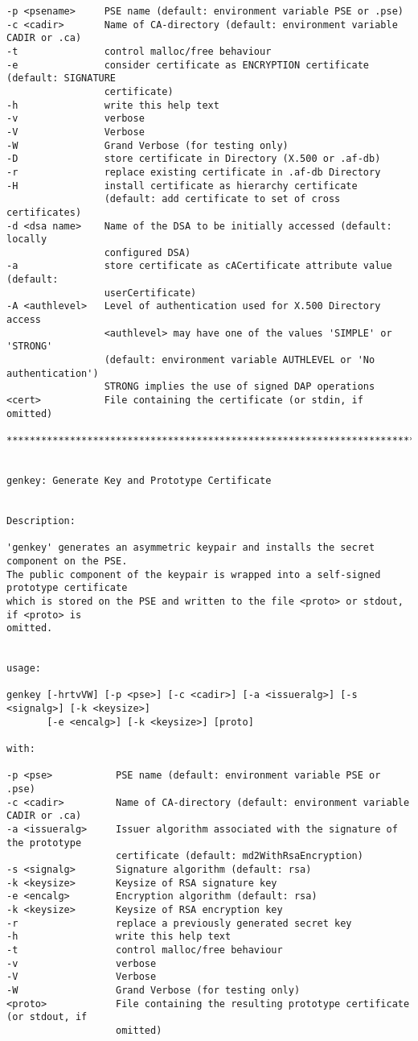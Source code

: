 {\begin{verbatim}
-p <psename>     PSE name (default: environment variable PSE or .pse)
-c <cadir>       Name of CA-directory (default: environment variable CADIR or .ca)
-t               control malloc/free behaviour
-e               consider certificate as ENCRYPTION certificate (default: SIGNATURE 
                 certificate)
-h               write this help text
-v               verbose
-V               Verbose
-W               Grand Verbose (for testing only)
-D               store certificate in Directory (X.500 or .af-db)
-r               replace existing certificate in .af-db Directory
-H               install certificate as hierarchy certificate
                 (default: add certificate to set of cross certificates)
-d <dsa name>    Name of the DSA to be initially accessed (default: locally 
                 configured DSA)
-a               store certificate as cACertificate attribute value (default: 
                 userCertificate)
-A <authlevel>   Level of authentication used for X.500 Directory access
                 <authlevel> may have one of the values 'SIMPLE' or 'STRONG'
                 (default: environment variable AUTHLEVEL or 'No authentication')
                 STRONG implies the use of signed DAP operations
<cert>           File containing the certificate (or stdin, if omitted)

****************************************************************************************


genkey: Generate Key and Prototype Certificate


Description:

'genkey' generates an asymmetric keypair and installs the secret component on the PSE.
The public component of the keypair is wrapped into a self-signed prototype certificate
which is stored on the PSE and written to the file <proto> or stdout, if <proto> is 
omitted.


usage:

genkey [-hrtvVW] [-p <pse>] [-c <cadir>] [-a <issueralg>] [-s <signalg>] [-k <keysize>]
       [-e <encalg>] [-k <keysize>] [proto]

with:

-p <pse>           PSE name (default: environment variable PSE or .pse)
-c <cadir>         Name of CA-directory (default: environment variable CADIR or .ca)
-a <issueralg>     Issuer algorithm associated with the signature of the prototype 
                   certificate (default: md2WithRsaEncryption)
-s <signalg>       Signature algorithm (default: rsa)
-k <keysize>       Keysize of RSA signature key
-e <encalg>        Encryption algorithm (default: rsa)
-k <keysize>       Keysize of RSA encryption key
-r                 replace a previously generated secret key
-h                 write this help text
-t                 control malloc/free behaviour
-v                 verbose
-V                 Verbose
-W                 Grand Verbose (for testing only)
<proto>            File containing the resulting prototype certificate (or stdout, if 
                   omitted)


\end{verbatim}}

